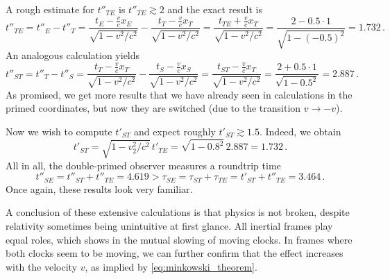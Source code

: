 \begin{ex}
\begin{itemize}
		A rough estimate for $t''_{TE}$ is $t''_{TE} \gtrsim 2$ and the exact result is
		\begin{equation*}
			t''_{TE} = t''_E - t''_T = \frac{t_E - \frac{v}{c} x_E}{\sqrt{1 - v^2 / c^2}} - \frac{t_T - \frac{v}{c} x_T}{\sqrt{1 - v^2 / c^2}} = \frac{t_{TE} + \frac{v}{c} x_T}{\sqrt{1 - v^2 / c^2}} = \frac{2 - 0.5 \cdot 1}{\sqrt{1 - (-0.5)^2}} = 1.732 \, .
		\end{equation*}
		An analogous calculation yields
		\begin{equation*}
			t''_{ST} = t''_T - t''_S = \frac{t_T - \frac{v}{c} x_T}{\sqrt{1 - v^2 / c^2}} - \frac{t_S - \frac{v}{c} x_S}{\sqrt{1 - v^2 / c^2}} = \frac{t_{ST} - \frac{v}{c} x_T}{\sqrt{1 - v^2 / c^2}} = \frac{2 + 0.5 \cdot 1}{\sqrt{1 - 0.5^2}} = 2.887 \, .
		\end{equation*}
		As promised, we get more results that we have already seen in calculations in the primed coordinates, but now they are switched (due to the transition $v \rightarrow -v$).
	
		Now we wish to compute $t'_{ST}$ and expect roughly $t'_{ST} \gtrsim 1.5$. Indeed, we obtain
		\begin{equation*}
			t'_{ST} = \sqrt{1 - v_2^2 / c^2} \, t'_{TE} = \sqrt{1 - 0.8^2} \, 2.887 = 1.732 \, .
		\end{equation*}
		All in all, the double-primed observer measures a roundtrip time
		\begin{equation*}
			t''_{SE} = t''_{ST} + t''_{TE} = 4.619 > \tau_{SE} = \tau_{ST} + \tau_{TE} = t'_{ST} + t''_{TE} = 3.464 \, .
		\end{equation*}
		Once again, these results look very familiar. 
	\end{itemize}
	
	
	
	A conclusion of these extensive calculations is that physics is not broken, despite relativity sometimes being unintuitive at first glance. All inertial frames play equal roles, which shows in the mutual slowing of moving clocks. In frames where both clocks seem to be moving, we can further confirm that the effect increases with the velocity $v$, as implied by \eqref{eq:minkowski_theorem}.
	

\end{ex}
